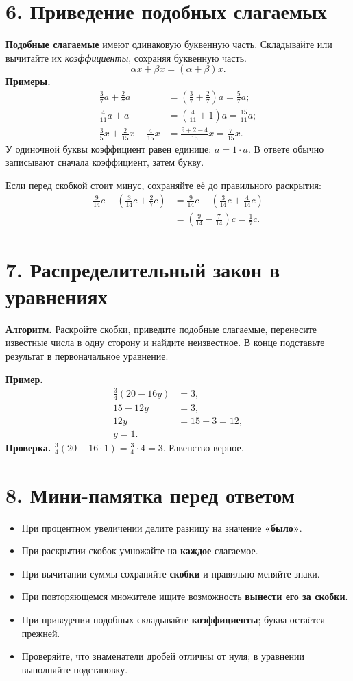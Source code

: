 \documentclass[a4paper,12pt]{article}
\newcommand{\sect}[1]{\Needspace{8\baselineskip}\section*{\color{darkaccent}#1}\vspace{-2mm}\noindent{\color{softline}\rule{\linewidth}{0.5pt}}\vspace{1mm}}
\newcommand{\markkey}[1]{\textcolor{darkaccent}{\textbf{#1}}}
\begin{document}
\sect{6. Приведение подобных слагаемых}
\textbf{Подобные слагаемые} имеют одинаковую буквенную часть. Складывайте или вычитайте их \emph{коэффициенты}, сохраняя буквенную часть.
\[
\boxed{\alpha x+\beta x=(\alpha+\beta)x.}
\]
\markkey{Примеры.}
\[
\begin{aligned}
\frac37a+\frac27a&=\left(\frac37+\frac27\right)a=\boxed{\frac57a};\\[2mm]
\frac4{11}a+a&=\left(\frac4{11}+1\right)a=\boxed{\frac{15}{11}a};\\[2mm]
\frac35x+\frac2{15}x-\frac4{15}x
&=\frac{9+2-4}{15}x=\boxed{\frac7{15}x}.
\end{aligned}
\]
У одиночной буквы коэффициент равен единице: \(a=1\cdot a\). В ответе обычно записывают сначала коэффициент, затем букву.

Если перед скобкой стоит минус, сохраняйте её до правильного раскрытия:
\[
\begin{aligned}
\frac9{14}c-\left(\frac3{14}c+\frac27c\right)
&=\frac9{14}c-\left(\frac3{14}c+\frac4{14}c\right)\\
&=\left(\frac9{14}-\frac7{14}\right)c
=\boxed{\frac17c}.
\end{aligned}
\]

\sect{7. Распределительный закон в уравнениях}
\markkey{Алгоритм.} Раскройте скобки, приведите подобные слагаемые, перенесите известные числа в одну сторону и найдите неизвестное. В конце подставьте результат в первоначальное уравнение.

\markkey{Пример.}
\[
\begin{aligned}
\frac34(20-16y)&=3,\\
15-12y&=3,\\
12y&=15-3=12,\\
\boxed{y=1}.&
\end{aligned}
\]
\markkey{Проверка.} \(\frac34(20-16\cdot1)=\frac34\cdot4=3\). Равенство верное.

\sect{8. Мини-памятка перед ответом}
\begin{itemize}
\item При процентном увеличении делите разницу на значение \textbf{«было»}.
\item При раскрытии скобок умножайте на \textbf{каждое} слагаемое.
\item При вычитании суммы сохраняйте \textbf{скобки} и правильно меняйте знаки.
\item При повторяющемся множителе ищите возможность \textbf{вынести его за скобки}.
\item При приведении подобных складывайте \textbf{коэффициенты}; буква остаётся прежней.
\item Проверяйте, что знаменатели дробей отличны от нуля; в уравнении выполняйте подстановку.
\end{itemize}
\end{document}
